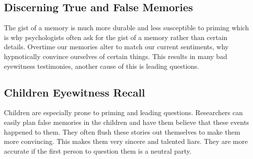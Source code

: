 \documentclass[12pt]{article}
\begin{document}
\subsection*{Discerning True and False Memories} The gist of a memory is much more durable and less susceptible to priming which is why psychologists often ask for the gist of a memory rather than certain details. Overtime our memories alter to match our current sentiments, why hypnotically convince ourselves of certain things. This results in many bad eyewitness testimonies, another cause of this is leading questions.
\subsection*{Children Eyewitness Recall} Children are especially prone to priming and leading questions. Researchers can easily plan false memories in the children and have them believe that these events happened to them. They often flush these stories out themselves to make them more convincing. This makes them very sincere and talented liars. They are more accurate if the first person to question them is a neutral party. 
\end{document}
